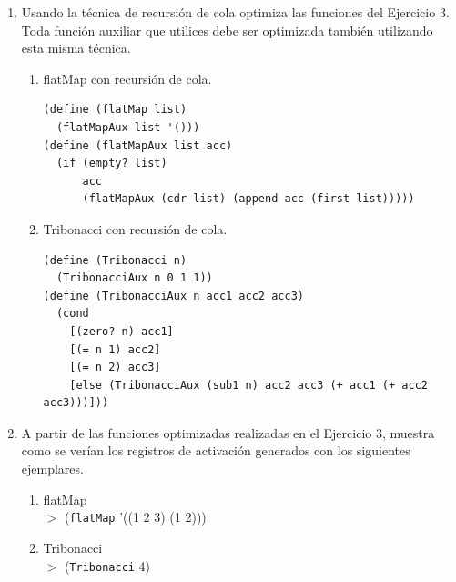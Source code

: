 \documentclass[11pt]{article}
\begin{document}
\begin{enumerate}[leftmargin=0.8cm]
\begin{enumerate}
        $>$ (\texttt{flatMap} '((1 2 3) (1 2))) 
        \item Tribonacci\\
        $>$ (\texttt{Tribonacci} 4)\\
    \end{enumerate}
    \item Usando la técnica de recursión de cola optimiza las funciones del Ejercicio 3. Toda función auxiliar que utilices debe ser optimizada también utilizando esta misma técnica.\\
    \begin{enumerate}
        \item flatMap con recursión de cola.
        \begin{lstlisting}
(define (flatMap list)
  (flatMapAux list '()))
(define (flatMapAux list acc)
  (if (empty? list)
      acc
      (flatMapAux (cdr list) (append acc (first list)))))
        \end{lstlisting}
        \item Tribonacci con recursión de cola.
        \begin{lstlisting}
(define (Tribonacci n)
  (TribonacciAux n 0 1 1))
(define (TribonacciAux n acc1 acc2 acc3)
  (cond
    [(zero? n) acc1]
    [(= n 1) acc2]
    [(= n 2) acc3]
    [else (TribonacciAux (sub1 n) acc2 acc3 (+ acc1 (+ acc2 acc3)))]))
        \end{lstlisting}
    \end{enumerate}
    \item A partir de las funciones optimizadas realizadas en el Ejercicio 3, muestra como se verían los registros de activación generados con los siguientes ejemplares.
    \begin{enumerate}
        \item flatMap\\
        $>$ (\texttt{flatMap} '((1 2 3) (1 2)))
        \item Tribonacci\\
        $>$ (\texttt{Tribonacci} 4)\\
    \end{enumerate}
\end{enumerate}
\end{document}
